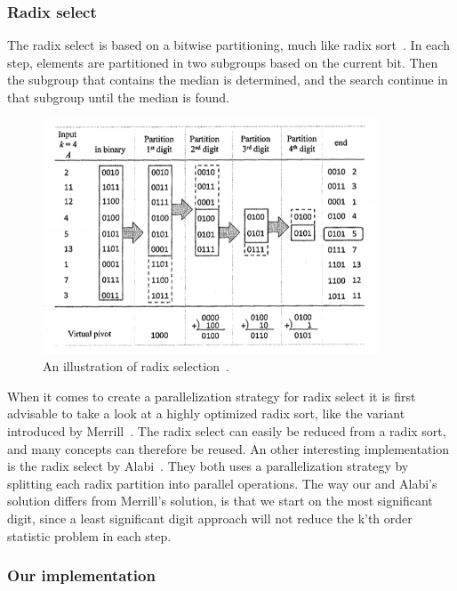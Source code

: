 \subsubsection{Radix select} %
\label{ssub:radix_select}

The radix select is based on a bitwise partitioning, much like radix sort~\cite[Chapter 8.3]{Cormen:2001}. In each step, elements are partitioned in two subgroups based on the current bit. Then the subgroup that contains the median is determined, and the search continue in that subgroup until the median is found.

\begin{figure}[ht!]
\centering
\includegraphics[width=100mm]{../gfx/Radix_select.png}

\caption{An illustration of radix selection~\cite{cayman:2012}.}
\label{fig:radix_select}
\end{figure}

When it comes to create a parallelization strategy for radix select it is first advisable to take a look at a highly optimized radix sort, like the variant introduced by Merrill~\cite{MerrillG11}. The radix select can easily be reduced from a radix sort, and many concepts can therefore be reused. An other interesting implementation is the radix select by Alabi~\citep{Alabi:2012}. They both uses a parallelization strategy by splitting each radix partition into parallel operations. The way our and Alabi's solution differs from Merrill's solution, is that we start on the most significant digit, since a least significant digit approach will not reduce the k'th order statistic problem in each step.

\subsubsection{Our implementation} %
\label{ssub:our_implementation}

